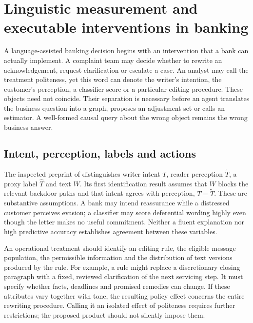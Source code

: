 \section[Linguistic measurement and executable interventions]{Linguistic measurement and executable interventions in banking}
\label{sec:exec28-lm}

A language-assisted banking decision begins with an intervention that a bank can actually implement. A complaint team may decide whether to rewrite an acknowledgement, request clarification or escalate a case. An analyst may call the treatment politeness, yet this word can denote the writer's intention, the customer's perception, a classifier score or a particular editing procedure. These objects need not coincide. Their separation is necessary before an agent translates the business question into a graph, proposes an adjustment set or calls an estimator. A well-formed causal query about the wrong object remains the wrong business answer.

\subsection{Intent, perception, labels and actions}

The inspected preprint of \citet{exec28_lm_pryzant} distinguishes writer intent $T$, reader perception $\widetilde T$, a proxy label $\widehat T$ and text $W$. Its first identification result assumes that $W$ blocks the relevant backdoor paths and that intent agrees with perception, $T=\widetilde T$. These are substantive assumptions. A bank may intend reassurance while a distressed customer perceives evasion; a classifier may score deferential wording highly even though the letter makes no useful commitment. Neither a fluent explanation nor high predictive accuracy establishes agreement between these variables.

An operational treatment should identify an editing rule, the eligible message population, the permissible information and the distribution of text versions produced by the rule. For example, a rule might replace a discretionary closing paragraph with a fixed, reviewed clarification of the next servicing step. It must specify whether facts, deadlines and promised remedies can change. If these attributes vary together with tone, the resulting policy effect concerns the entire rewriting procedure. Calling it an isolated effect of politeness requires further restrictions; the proposed product should not silently impose them.

